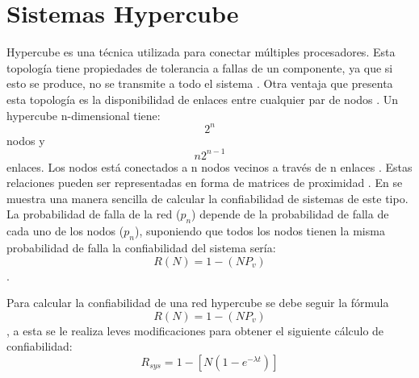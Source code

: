 \section{Sistemas Hypercube}
Hypercube es una técnica utilizada para
conectar múltiples procesadores. Esta topología
tiene propiedades de tolerancia a fallas de un
componente, ya que si esto se produce, no se
transmite a todo el sistema \citep{Rong96}. Otra ventaja que
presenta esta topología es la disponibilidad de
enlaces entre cualquier par de nodos \citep{Mostafa14}. Un
hypercube n-dimensional tiene: $$2^n $$ nodos y $$n2^{n-1}$$ enlaces.
Los nodos está conectados a n nodos vecinos a través de n enlaces \citep{Rong96}. Estas
relaciones pueden ser representadas en forma de matrices de proximidad \citep{Mostafa14}.
En \cite{Mostafa14} se muestra una manera sencilla de calcular la confiabilidad
de sistemas de este tipo. La probabilidad de falla de la red ($p_n$) depende
de la probabilidad de falla de cada uno de los nodos ($p_n$), suponiendo
que todos los nodos tienen la misma probabilidad de falla la confiabilidad
del sistema sería: $$R(N) = 1 -(NP_v)$$.

Para calcular la confiabilidad de una red hypercube se debe seguir
la fórmula $$R(N) = 1 -(NP_v)$$, a esta se le realiza leves modificaciones
para obtener el siguiente cálculo de confiabilidad: $$ R_{sys} = 1 - [N(1-e^{- \lambda t})]$$
